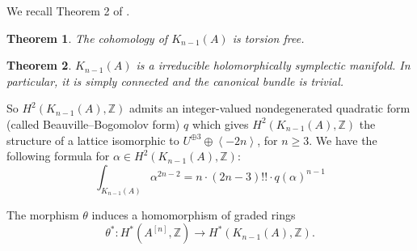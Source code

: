\documentclass{amsart}
\newcommand{\hilb}[1]{^{[#1]}}
\newcommand{\kum}[2]{K_{ #2 }( #1 )}
\newcommand{\Z}{\mathbb{Z}}
\theoremstyle{plain}
\newtheorem{theorem}{Theorem}[section]
\theoremstyle{definition}
\theoremstyle{remark}
\begin{document}
We recall Theorem 2 of \cite{Spanier}.
\begin{theorem}\label{torsion}
The cohomology of $\kum{A}{n-1}$ is torsion free. 
\end{theorem}

\begin{theorem}\cite{Beauville}
$\kum{A}{n-1}$ is a irreducible holomorphically symplectic manifold. In particular, it is simply connected and the canonical bundle is trivial.
\end{theorem}
So $H^2(\kum{A}{n-1},\Z)$ admits an integer-valued nondegenerated quadratic form (called Beauville--Bogomolov form) $q$ which gives $H^2(\kum{A}{n-1},\Z)$ the structure of a lattice isomorphic to $U^{\oplus 3}\oplus \left< -2n \right>$, for $n\geq 3$. We have the following formula for $\alpha\in H^2(\kum{A}{n-1},\Z)$:
\begin{equation} \label{fujiki}
\int_{\kum{A}{n-1}} \alpha^{2n-2} = n\cdot(2n-3)!!\cdot q(\alpha)^{n-1}
\end{equation}


The morphism $\theta$ induces a homomorphism of graded rings
\begin{equation}
\theta^* :H^*(A\hilb{n},\Z)\longrightarrow H^*(\kum{A}{n-1},\Z).
\end{equation}
\end{document}
